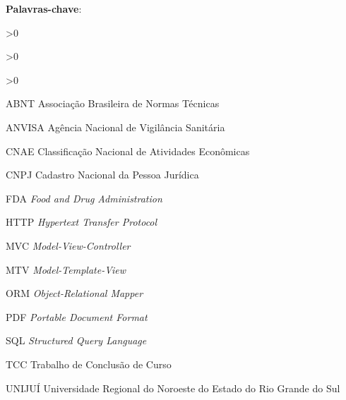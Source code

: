\documentclass[
    12pt,               %
    oneside,            %
    a4paper,            %
    chapter=TITLE,      %
    section=TITLE,      %
    english,            %
    brazil              %
]{abntex2}
\begin{document}
\begin{resumo}
    \imprimirresumo
    \par
    \noindent \textbf{Palavras-chave}: \imprimirpalavraschave
\end{resumo}

\ifnum{}>0
    \listoffigures*
    \cleardoublepage
\fi

\ifnum{}>0
    \listofquadros*
    \cleardoublepage
\fi

\ifnum{}>0
    \listoftables*
    \cleardoublepage
\fi

\begin{siglas}
    \item[ABNT]   Associação Brasileira de Normas Técnicas
    \item[ANVISA] Agência Nacional de Vigilância Sanitária
     \item[CNAE]   Classificação Nacional de Atividades Econômicas
    \item[CNPJ]   Cadastro Nacional da Pessoa Jurídica
    \item[FDA]    \textit{Food and Drug Administration}
    \item[HTTP]   \textit{Hypertext Transfer Protocol}
    \item[MVC]    \textit{Model-View-Controller}
    \item[MTV]    \textit{Model-Template-View}
    \item[ORM]    \textit{Object-Relational Mapper}
    \item[PDF]    \textit{Portable Document Format}
    \item[SQL]    \textit{Structured Query Language}
    \item[TCC]    Trabalho de Conclusão de Curso
    \item[UNIJUÍ] Universidade Regional do Noroeste do Estado do Rio Grande do Sul
\end{siglas}

\end{document}
